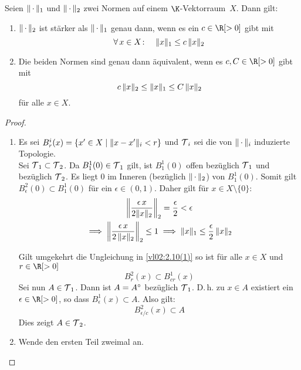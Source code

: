 \begin{thEmpty}
    Seien $\emptyNorm_1$ und $\emptyNorm_2$ zwei Normen auf einem
    $\K$-Vektorraum~$X$. Dann gilt:
    \begin{enumerate}[(1)]
        \item\label{vl02:2.10(1)}
            $\emptyNorm_2$ ist stärker als $\emptyNorm_1$ genau dann, wenn es
            ein $c\in\R[>0]$ gibt mit
            \[ \forall\,x\in X\colon\quad \norm{x}_1 \leq c\,\norm{x}_2 \]
        \item
            Die beiden Normen sind genau dann äquivalent, wenn es $c,C\in\R[>0]$
            gibt mit
            \[ c\,\norm{x}_2 \leq \norm{x}_1 \leq C\,\norm{x}_2 \]
            für alle $x\in X$.
    \end{enumerate}
\end{thEmpty}

\begin{proof}
    \begin{enumerate}[(1)]
        \item
            Es sei $B_r^i(x) = \{ x'\in X \Mid \norm{x-x'}_i < r \}$ und $\Topo_i$ sei die von
            $\emptyNorm_i$ induzierte Topologie.
            \\
            Sei $\Topo_1\subset\Topo_2$. Da $B_1^1(0) \in \Topo_1$ gilt, ist
            $B_1^1(0)$ offen
            bezüglich $\Topo_1$ und bezüglich $\Topo_2$. Es liegt $0$ im Inneren
            (bezüglich $\emptyNorm_2$) von $B_1^1(0)$. Somit gilt
            $B_\epsilon^2(0) \subset
            B_1^1(0)$ für ein $\epsilon\in(0,1)$. Daher gilt für $x\in X\setminus\{0\}$:
            \begin{gather*}
                \norm*{ \frac{\epsilon\,x}{2\norm{x}_2} }_2 = \frac{\epsilon}{2} 
                < \epsilon
                \\
                \implies \norm*{\frac{\epsilon\,x}{2\,\norm{x}_2}}_2 \leq 1
                \implies \norm{x}_1 \leq \frac{\epsilon}{2}\,\norm{x}_2
            \end{gather*}

            Gilt umgekehrt die Ungleichung in \ref{vl02:2.10(1)} 
            so ist für alle $x\in X$ und $r\in\R[>0]$
            \[ B_r^2(x) \subset B_{cr}^1(x) \]
            Sei nun $A\in\Topo_1$. Dann ist $A=\setinterior{A}$ bezüglich $\Topo_1$.
            D.\,h. zu $x\in A$ existiert ein $\epsilon\in\R[>0]$, so dass
            $B_\epsilon^1(x)\subset A$. Also gilt:
            \[ B_{\epsilon/c}^2(x) \subset A \]
            Dies zeigt $A\in\Topo_2$.

        \item
            Wende den ersten Teil zweimal an.
    \end{enumerate}
\end{proof}


